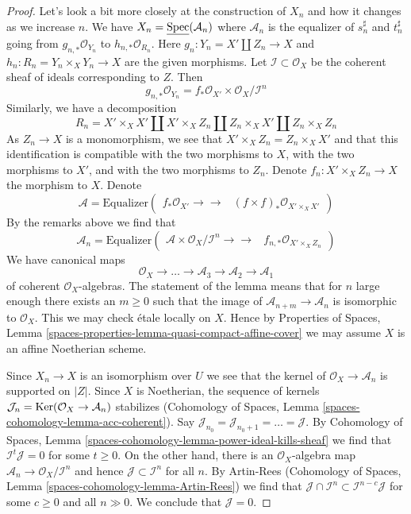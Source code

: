 \begin{proof}
Let's look a bit more closely at the construction of $X_n$
and how it changes as we increase $n$. We have
$X_n = \underline{\operatorname{Spec}}(\mathcal{A}_n)$
where $\mathcal{A}_n$ is the equalizer of $s_n^\sharp$ and $t_n^\sharp$
going from $g_{n , *}\mathcal{O}_{Y_n}$ to $h_{n, *}\mathcal{O}_{R_n}$.
Here $g_n : Y_n = X' \amalg Z_n \to X$ and $h_n : R_n = Y_n \times_X Y_n \to X$
are the given morphisms. Let $\mathcal{I} \subset \mathcal{O}_X$ be the
coherent sheaf of ideals corresponding to $Z$. Then
$$
g_{n, *}\mathcal{O}_{Y_n} =
f_*\mathcal{O}_{X'} \times \mathcal{O}_X/\mathcal{I}^n
$$
Similarly, we have a decomposition
$$
R_n = X' \times_X X' \amalg X' \times_X Z_n \amalg
Z_n \times_X X' \amalg Z_n \times_X Z_n
$$
As $Z_n \to X$ is a monomorphism, we see that
$X' \times_X Z_n = Z_n \times_X X'$ and that this identification
is compatible with the two morphisms to $X$, with the two morphisms to
$X'$, and with the two morphisms to $Z_n$.
Denote $f_n : X' \times_X Z_n \to X$ the morphism to $X$.
Denote
$$
\mathcal{A} = \text{Equalizer}(
\begin{array}{cc}f_*\mathcal{O}_{X'} \longrightarrow\longrightarrow & (f \times f)_*\mathcal{O}_{X' \times_X X'}\end{array}
)
$$
By the remarks above we find that
$$
\mathcal{A}_n =
\text{Equalizer}(
\begin{array}{cc}\mathcal{A} \times \mathcal{O}_X/\mathcal{I}^n \longrightarrow\longrightarrow & f_{n, *}\mathcal{O}_{X' \times_X Z_n}\end{array}
)
$$
We have canonical maps
$$
\mathcal{O}_X \to \ldots \to \mathcal{A}_3 \to \mathcal{A}_2 \to \mathcal{A}_1
$$
of coherent $\mathcal{O}_X$-algebras. The statement of the lemma means that
for $n$ large enough there exists an $m \geq 0$ such that the image of
$\mathcal{A}_{n + m} \to \mathcal{A}_n$ is isomorphic to $\mathcal{O}_X$.
This we may check \'etale locally on $X$. Hence by Properties of Spaces,
Lemma \ref{spaces-properties-lemma-quasi-compact-affine-cover}
we may assume $X$ is an affine Noetherian scheme.

\medskip\noindent
Since $X_n \to X$ is an isomorphism over $U$ we see that the kernel
of $\mathcal{O}_X \to \mathcal{A}_n$ is supported on $|Z|$.
Since $X$ is Noetherian, the sequence of kernels
$\mathcal{J}_n = \operatorname{Ker}(\mathcal{O}_X \to \mathcal{A}_n)$ stabilizes
(Cohomology of Spaces, Lemma \ref{spaces-cohomology-lemma-acc-coherent}).
Say $\mathcal{J}_{n_0} = \mathcal{J}_{n_0 + 1} = \ldots = \mathcal{J}$.
By Cohomology of Spaces, Lemma
\ref{spaces-cohomology-lemma-power-ideal-kills-sheaf}
we find that $\mathcal{I}^t \mathcal{J} = 0$ for some $t \geq 0$.
On the other hand, there is an $\mathcal{O}_X$-algebra map
$\mathcal{A}_n \to \mathcal{O}_X/\mathcal{I}^n$
and hence $\mathcal{J} \subset \mathcal{I}^n$ for all $n$.
By Artin-Rees (Cohomology of Spaces, Lemma
\ref{spaces-cohomology-lemma-Artin-Rees}) we find that
$\mathcal{J} \cap \mathcal{I}^n \subset \mathcal{I}^{n - c}\mathcal{J}$
for some $c  \geq 0$ and all $n \gg 0$. We conclude that $\mathcal{J} = 0$.


\end{proof}
